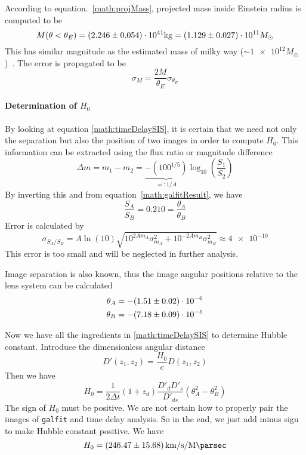 According to equation.~\ref{math:projMass}, projected mass inside Einstein radius is computed to be
\begin{equation}
	M(\theta < \theta_E) = (\num{2.246 +- 0.054}) \cdot 10^{41} \si{\kg} = (\num{1.129 +- 0.027}) \cdot 10^{11} M_\odot
\end{equation}
This has similar magnitude as the estimated mass of milky way ($\sim \num{1e12} M_\odot$)~\cite{Grand_2019}. The error is propagated to be
\begin{equation*}
	\sigma_{M} = \frac{2M}{\theta_E} \sigma_{\theta_E}
\end{equation*}

\paragraph{Determination of $H_0$}
By looking at equation \eqref{math:timeDelaySIS}, it is certain that we need not only the separation but also the position of two images in order to compute $H_0$. This information can be extracted using the flux ratio or magnitude difference
\begin{equation}
	\Delta m = m_1 - m_2 = \underbrace{ - (100^{1/5})}_{=: 1/A} \log_{10} \left( \frac{S_1}{S_2} \right)
\end{equation}
By inverting this and from equation~\eqref{math:galfitResult}, we have
\begin{equation}
	\frac{S_A}{S_B} = \num{0.210}  = \frac{\theta_A}{\theta_B}
\end{equation}
Error is calculated by
\begin{equation*}
	\sigma_{S_A/S_B} = A \ln(10) \sqrt{ 10^{2Am_A} \sigma_{m_A}^2 + 10^{-2Am_B}\sigma_{m_B}^2} \approx \num{4e-10}
\end{equation*}
This error is too small and will be neglected in further analysis.

Image separation is also known, thus the image angular positions relative to the lens system can be calculated
\begin{align}
	\begin{split}	
	\theta_A &= -(\num{1.51 +- 0.02 })\cdot 10^{-6}\\
	\theta_B &= -(\num{7.18 +- 0.09})\cdot 10^{-5}
	\end{split}
\end{align}

Now we have all the ingredients in \eqref{math:timeDelaySIS} to determine Hubble constant. Introduce the dimensionless angular distance
\begin{equation*}
	D'(z_1, z_2 ) = \frac{H_0}{c} D(z_1, z_2)
\end{equation*}
Then we have
\begin{equation}
	H_0 =  \frac{1}{2 \Delta t} (1+z_d) \frac{D'_d D'_s}{D'_{ds}} (\theta_A^2 - \theta_B^2)
\end{equation}
The sign of $H_0$ must be positive. We are not certain how to properly pair the images of \verb|galfit| and time delay analysis. So in the end, we just add minus sign to make Hubble constant positive. We have
\begin{equation}
	H_0 = \SI{246.47 +- 15.68}{\km\per\s\per\mega\parsec}
\end{equation}
